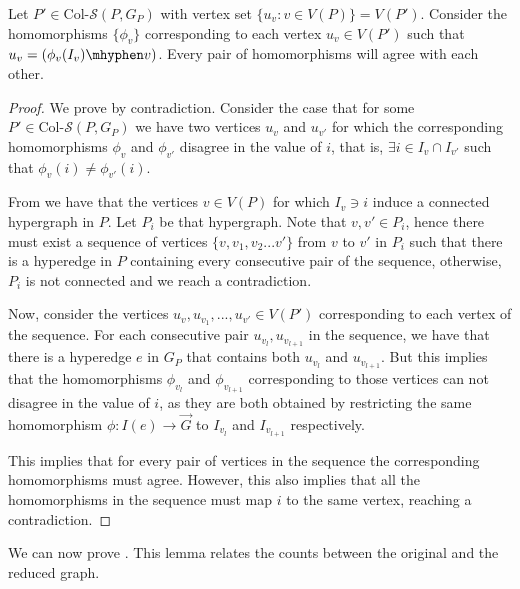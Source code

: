 \documentclass[a4paper,UKenglish,cleveref, autoref, numberwithinsect, thm-restate]{lipics-v2021}
\newcommand{\reduced}[1]{G_{#1}}
\newcommand{\colSetSub}{\text{Col-}\cS}
\newcommand{\cS}{\mathcal{S}}
\begin{document}
	\begin{claim} \label{clm:connected}
		Let $P' \in \colSetSub(P,\reduced{P})$ with vertex set $\{u_v : v \in V(P)\} = V(P')$. Consider the homomorphisms $\{\phi_v\}$ corresponding to each vertex $u_v \in V(P')$ such that $u_v = (\phi_v(I_v)\mhyphen v)$. Every pair of homomorphisms will agree with each other.
	\end{claim}
	\begin{proof}
		We prove by contradiction. Consider the case that for some $P' \in \colSetSub(P,\reduced{P})$ we have two vertices $u_v$ and $u_{v'}$ for which the corresponding homomorphisms $\phi_v$ and $\phi_{v'}$ disagree in the value of $i$, that is, $\exists i \in I_v \cap I_{v'}$ such that $\phi_{v}(i) \neq \phi_{v'}(i)$.
		
		From  we have that the vertices $v \in V(P)$ for which $I_v \ni i$ induce a connected hypergraph in $P$. Let $P_i$ be that hypergraph. Note that $v,v' \in P_i$, hence there must exist a sequence of vertices $\{v, v_1, v_2 ... v'\}$  from $v$ to $v'$ in $P_i$ such that there is a hyperedge in $P$ containing every consecutive pair of the sequence, otherwise, $P_i$ is not connected and we reach a contradiction.
		
		Now, consider the vertices $u_v, u_{v_1},..., u_{v'} \in V(P')$ corresponding to each vertex of the sequence. For each consecutive pair $u_{v_l},u_{v_{l+1}}$ in the sequence, we have that there is a hyperedge $e$ in $\reduced{P}$ that contains both $u_{v_l}$ and $u_{v_{l+1}}$. But this implies that the homomorphisms $\phi_{v_l}$ and $\phi_{v_{l+1}}$ corresponding to those vertices can not disagree in the value of $i$, as they are both obtained by restricting the same homomorphism $\phi: I(e) \to \vec{G}$ to $I_{v_l}$ and $I_{v_{l+1}}$ respectively.
		
		This implies that for every pair of vertices in the sequence the corresponding homomorphisms must agree. However, this also implies that all the homomorphisms in the sequence must map $i$ to the same vertex, reaching a contradiction.
	\end{proof}
	
	We can now prove . This lemma relates the counts between the original and the reduced graph.
	
\end{document}
